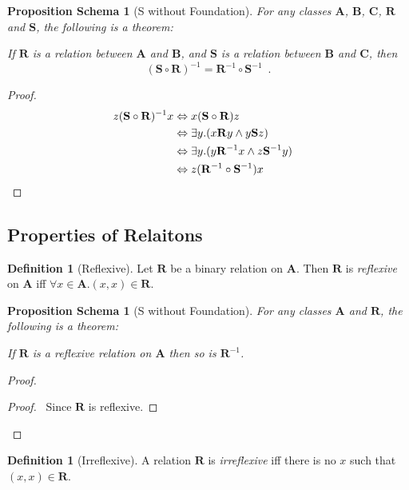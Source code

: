 \documentclass{book}
\let\qed\relax
\newtheorem{props}[ax]{Proposition Schema}
\theoremstyle{definition}
\newtheorem{df}[ax]{Definition}
\begin{document}
\begin{props}[S without Foundation]
For any classes $\mathbf{A}$, $\mathbf{B}$, $\mathbf{C}$, $\mathbf{R}$ and $\mathbf{S}$, the following is a theorem:

If $\mathbf{R}$ is a relation between $\mathbf{A}$ and $\mathbf{B}$, and $\mathbf{S}$ is a relation between $\mathbf{B}$ and $\mathbf{C}$, then
\[ (\mathbf{S} \circ \mathbf{R})^{-1} = \mathbf{R}^{-1} \circ \mathbf{S}^{-1} \enspace . \]
\end{props}

\begin{proof}
\pf
\begin{align*}
z(\mathbf{S} \circ \mathbf{R})^{-1}x & \Leftrightarrow x(\mathbf{S} \circ \mathbf{R})z \\
& \Leftrightarrow \exists y. (x \mathbf{R} y \wedge y \mathbf{S}z) \\
& \Leftrightarrow \exists y. (y \mathbf{R}^{-1} x \wedge z \mathbf{S}^{-1} y) \\
& \Leftrightarrow z (\mathbf{R}^{-1} \circ \mathbf{S}^{-1}) x & \qed
\end{align*}
\end{proof}

\subsection{Properties of Relaitons}

\begin{df}[Reflexive]
Let $\mathbf{R}$ be a binary relation on $\mathbf{A}$. Then $\mathbf{R}$ is \emph{reflexive} on $\mathbf{A}$ iff $\forall x \in \mathbf{A}. (x,x) \in \mathbf{R}$.
\end{df}

\begin{props}[S without Foundation]
\label{prop:invref}
For any classes $\mathbf{A}$ and $\mathbf{R}$, the following is a theorem:

If $\mathbf{R}$ is a reflexive relation on $\mathbf{A}$ then so is $\mathbf{R}^{-1}$.
\end{props}

\begin{proof}
\pf
{}
\begin{proof}
	\pf\ Since $\mathbf{R}$ is reflexive.
\end{proof}
\qed
\end{proof}

\begin{df}[Irreflexive]
A relation $\mathbf{R}$ is \emph{irreflexive} iff there is no $x$ such that $(x,x) \in \mathbf{R}$.
\end{df}
\end{document}
